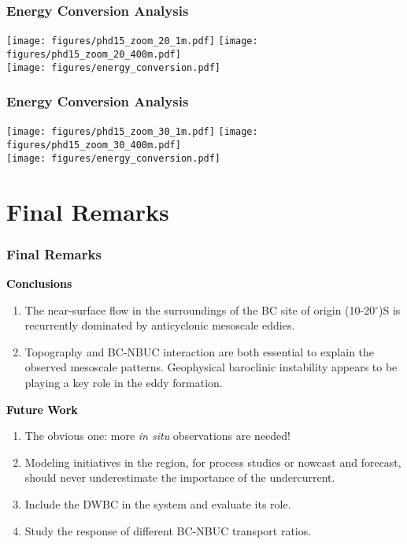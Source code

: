 \documentclass{beamer}
\begin{document}
\frame
{
  \frametitle{Energy Conversion Analysis}
\begin{center}
\texttt{[image: figures/phd15\_zoom\_20\_1m.pdf]}
\texttt{[image: figures/phd15\_zoom\_20\_400m.pdf]}\\
\texttt{[image: figures/energy\_conversion.pdf]}
\end{center}
}

\frame
{
  \frametitle{Energy Conversion Analysis}
\begin{center}
\texttt{[image: figures/phd15\_zoom\_30\_1m.pdf]}
\texttt{[image: figures/phd15\_zoom\_30\_400m.pdf]}\\
\texttt{[image: figures/energy\_conversion.pdf]}
\end{center}
}

\section{Final Remarks}

\frame
{
  \frametitle{Final Remarks}
\begin{footnotesize}
\begin{alertblock}{\textcolor{black}{\bf Conclusions}}
  \begin{enumerate}
    \item{The near-surface flow in the surroundings of the BC site of origin (10-20$^\circ$)S
          is recurrently dominated by anticyclonic mesoscale eddies.}
    \item{Topography and BC-NBUC interaction are both 
          essential to explain the observed mesoscale patterns. Geophysical baroclinic instability appears to be playing a key role in the eddy formation. }
  \end{enumerate}
\end{alertblock}

\begin{alertblock}{\textcolor{black}{\bf Future Work}}
  \begin{enumerate}
    \item{The obvious one: more {\it in situ} observations are needed!  }
    \item{Modeling initiatives in the region, for process studies or nowcast and forecast, should
          never underestimate the importance of the undercurrent.}
    \item{Include the DWBC in the system and evaluate its role. }
    \item{Study the response of different BC-NBUC transport ratios.}
  \end{enumerate}
\end{alertblock}
\end{footnotesize}

}
\end{document}
